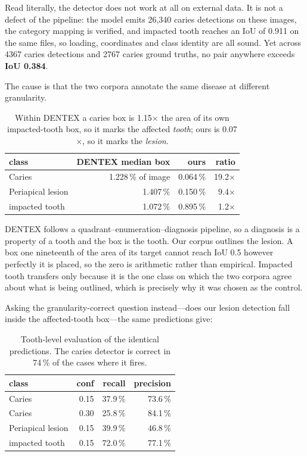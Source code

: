 \documentclass[10pt,twocolumn,letterpaper]{article}
\begin{document}
Read literally, the detector does not work at all on external data. It is not a
defect of the pipeline: the model emits 26{,}340 caries detections on these
images, the category mapping is verified, and impacted tooth reaches an IoU of
0.911 on the same files, so loading, coordinates and class identity are all
sound. Yet across 4367 caries detections and 2767 caries ground truths, no pair
anywhere exceeds \textbf{IoU 0.384}.

The cause is that the two corpora annotate the same disease at different
granularity.

\begin{table}[h]
\centering\small
\begin{tabular}{lrrr}
\toprule
class & DENTEX median box & ours & ratio \\
\midrule
Caries & 1.228\,\% of image & 0.064\,\% & 19.2$\times$ \\
Periapical lesion & 1.407\,\% & 0.150\,\% & 9.4$\times$ \\
impacted tooth & 1.072\,\% & 0.895\,\% & 1.2$\times$ \\
\bottomrule
\end{tabular}
\caption{Within DENTEX a caries box is 1.15$\times$ the area of its own
impacted-tooth box, so it marks the affected \emph{tooth}; ours is
0.07$\times$, so it marks the \emph{lesion}.}
\end{table}

DENTEX follows a quadrant--enumeration--diagnosis pipeline, so a diagnosis is a
property of a tooth and the box is the tooth. Our corpus outlines the lesion. A
box one nineteenth of the area of its target cannot reach IoU 0.5 however
perfectly it is placed, so the zero is arithmetic rather than empirical.
Impacted tooth transfers only because it is the one class on which the two
corpora agree about what is being outlined, which is precisely why it was
chosen as the control.

Asking the granularity-correct question instead---does our lesion detection
fall inside the affected-tooth box---the same predictions give:

\begin{table}[h]
\centering\small
\begin{tabular}{lrrr}
\toprule
class & conf & recall & precision \\
\midrule
Caries & 0.15 & 37.9\,\% & 73.6\,\% \\
Caries & 0.30 & 25.8\,\% & 84.1\,\% \\
Periapical lesion & 0.15 & 39.9\,\% & 46.8\,\% \\
impacted tooth & 0.15 & 72.0\,\% & 77.1\,\% \\
\bottomrule
\end{tabular}
\caption{Tooth-level evaluation of the identical predictions. The caries
detector is correct in 74\,\% of the cases where it fires.}
\end{table}
\end{document}

